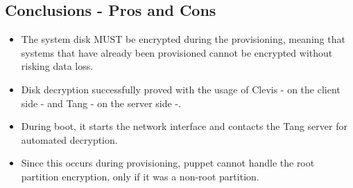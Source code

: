 \subsection{Conclusions - Pros and Cons}
\begin{itemize}
  \item The system disk MUST be encrypted during the provisioning, meaning that systems that have already been provisioned cannot be encrypted without risking data loss.
  \item Disk decryption successfully proved with the usage of Clevis - on the client side - and Tang - on the server side -. 
  \item During boot, it starts the network interface and contacts the Tang server for automated decryption.
  \item Since this occurs during provisioning, puppet cannot handle the root partition encryption, only if it was a non-root partition.
\end{itemize}


\newpage